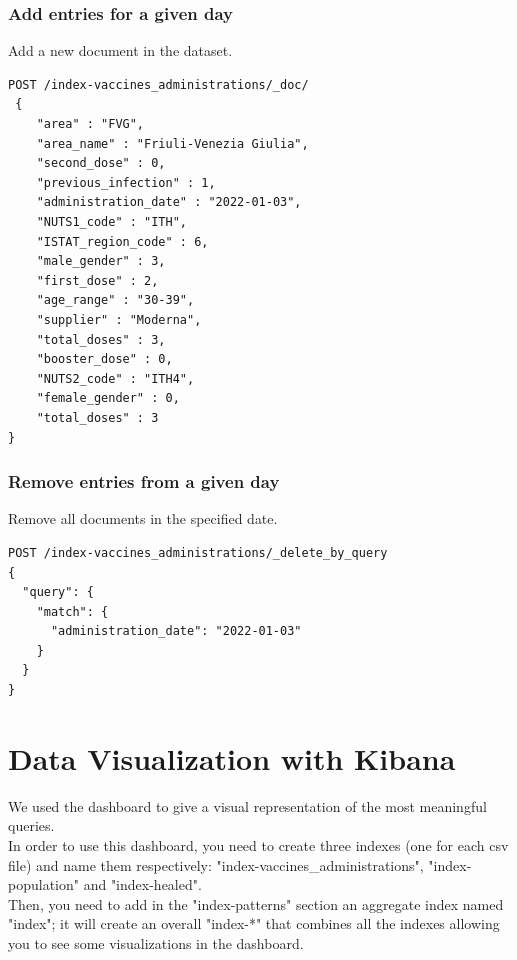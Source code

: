 \documentclass[12pt, a4paper]{article}
\begin{document}
\subsubsection{Add entries for a given day}
Add a new document in the dataset.
\begin{tcolorbox}[fontupper=\scriptsize]
  \begin{verbatim}
POST /index-vaccines_administrations/_doc/
 {    
    "area" : "FVG",
    "area_name" : "Friuli-Venezia Giulia",
    "second_dose" : 0,
    "previous_infection" : 1,
    "administration_date" : "2022-01-03",
    "NUTS1_code" : "ITH",
    "ISTAT_region_code" : 6,
    "male_gender" : 3,
    "first_dose" : 2,
    "age_range" : "30-39",
    "supplier" : "Moderna",
    "total_doses" : 3,
    "booster_dose" : 0,
    "NUTS2_code" : "ITH4",
    "female_gender" : 0,
    "total_doses" : 3
}
  \end{verbatim}
\end{tcolorbox}

\subsubsection{Remove entries from a given day}
Remove all documents in the specified date.
\begin{tcolorbox}[fontupper=\scriptsize]
  \begin{verbatim}
POST /index-vaccines_administrations/_delete_by_query
{
  "query": {
    "match": {
      "administration_date": "2022-01-03"
    }
  }
}
  \end{verbatim}
\end{tcolorbox}

\clearpage

\section{Data Visualization with Kibana}

We used the dashboard to give a visual representation of the most meaningful queries. \\
In order to use this dashboard, you need to create three indexes (one for each csv file)
and name them respectively: "index-vaccines\_administrations", "index-population" and 
"index-healed". \\
Then, you need to add in the "index-patterns" section an aggregate index named "index"; 
it will create an overall "index-*" that combines all the indexes allowing you to see 
some visualizations in the dashboard. 
\end{document}
